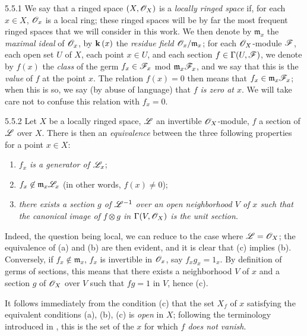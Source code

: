 \begin{env}{5.5.1}
\label{env-0.5.5.1}
We say that a ringed space $(X,\mathscr{O}_X)$ is a \emph{locally ringed space} if, for each
$x\in X$, $\mathscr{O}_x$ is a local ring; these ringed spaces will be by far the most frequent
ringed spaces that we will consider in this work. We then denote by $\mathfrak{m}_x$ the
\emph{maximal ideal} of $\mathscr{O}_x$, by $\mathbf{k}\,(x)$ the \emph{residue field
$\mathscr{O}_x/\mathfrak{m}_x$}; for each $\mathscr{O}_X$-module $\mathscr{F}$, each open set $U$ of $X$, each
point $x\in U$, and each section $f\in\Gamma(U,\mathscr{F})$, we denote by $f(x)$ the \emph{class}
of the germ $f_x\in\mathscr{F}_x$ mod $\mathfrak{m}_x\mathscr{F}_x$, and we say that this is the
\emph{value} of $f$ at the point $x$. The relation $f(x)=0$ then means that
$f_x\in\mathfrak{m}_x\mathscr{F}_x$; when this is so, we say (by abuse of language) that
\emph{$f$ is zero at $x$}. We will take care not to confuse this relation with $f_x=0$.
\end{env}

\begin{env}{5.5.2}
\label{env-0.5.5.2}
Let $X$ be a locally ringed space, $\mathscr{L}$ an invertible $\mathscr{O}_X$-module, $f$ a section of
$\mathscr{L}$ over $X$. There is then an \emph{equivalence} between the three following properties
for a point $x\in X$:
\begin{enumerate}[label=(\alph*)]
  \item \emph{$f_x$ is a generator of $\mathscr{L}_x$};
  \item \emph{$f_x\not\in\mathfrak{m}_x\mathscr{L}_x$} (in other words, $f(x)\neq 0$);
  \item \emph{there exists a section $g$ of $\mathscr{L}^{-1}$ over an open neighborhood $V$ of
        $x$ such that the canonical image of $f\otimes g$ in $\Gamma(V,\mathscr{O}_X)$
         is the unit section}.
\end{enumerate}

Indeed, the question being local, we can reduce to the case where $\mathscr{L}=\mathscr{O}_X$; the
equivalence of (a) and (b) are then evident, and it is clear that (c) implies (b).
Conversely, if $f_x\not\in\mathfrak{m}_x$, $f_x$ is invertible in $\mathscr{O}_x$, say $f_x g_x=1_x$.
By definition of germs of sections, this means that there exists a neighborhood $V$ of $x$
and a section $g$ of $\mathscr{O}_X$ over $V$ such that $fg=1$ in $V$, hence (c).

It follows immediately from the condition (c) that the set $X_f$ of $x$ satisfying the
equivalent conditions (a), (b), (c) is \emph{open} in $X$; following the terminology
introduced in , this is the set of the $x$ for which \emph{$f$ does not
vanish}.
\end{env}

